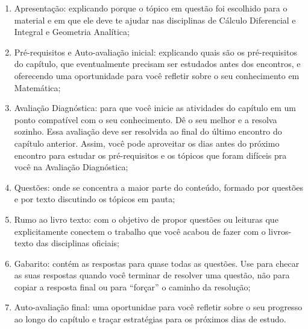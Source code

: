 \begin{enumerate}
 \item Apresentação: explicando porque o tópico em questão foi escolhido para o material e em que ele deve te ajudar nas disciplinas de Cálculo Diferencial e Integral e Geometria Analítica;
 \item Pré-requisitos e Auto-avaliação inicial: explicando quais são os pré-requisitos do capítulo, que eventualmente precisam ser estudados antes dos encontros, e oferecendo uma oportunidade para você refletir sobre o seu conhecimento em Matemática;
 \item Avaliação Diagnóstica: para que você inicie as atividades do capítulo em um ponto compatível com o seu conhecimento. Dê o seu melhor e a resolva sozinho. Essa avaliação deve ser resolvida ao final do último encontro do capítulo anterior. Assim, você pode aproveitar os dias antes do próximo encontro para estudar os pré-requisitos e os tópicos que foram difíceis pra você na Avaliação Diagnóstica;
 \item Questões: onde se concentra a maior parte do conteúdo, formado por questões e por texto discutindo os tópicos em pauta;
 \item Rumo ao livro texto: com o objetivo de propor questões ou leituras que explicitamente conectem o trabalho que você acabou de fazer com o livros-texto das disciplinas oficiais;
 \item Gabarito: contém as respostas para quase todas as questões. Use para checar as suas respostas quando você terminar de resolver uma questão, não para copiar a resposta final ou para ``forçar'' o caminho da resolução;
 \item Auto-avaliação final: uma oportunidae para você refletir sobre o seu progresso ao longo do capítulo e traçar estratégias para os próximos dias de estudo.
\end{enumerate}


